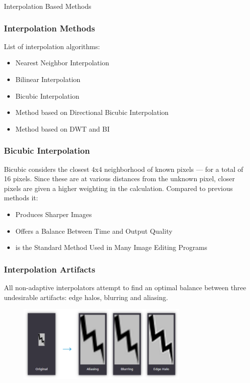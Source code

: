 \documentclass[11pt, presentation]{beamer}
\begin{document}
\begin{section}{Interpolation Based Methods}
\begin{frame}
\begin{figure}
                \label{fig:img-interpolation}
            \end{figure}
        \end{frame}
        \begin{frame}[label=interpolation]
            \frametitle{Interpolation Methods}
            List of interpolation algorithms:
            \begin{itemize}
                \item Nearest Neighbor Interpolation
                \item Bilinear Interpolation
                \item Bicubic Interpolation
                \item Method based on Directional Bicubic Interpolation
                \item Method based on DWT and BI
            \end{itemize}
        \end{frame}
        \begin{frame}
            \frametitle{Bicubic Interpolation}
            Bicubic considers the closest 4x4 neighborhood of known pixels — for a total of 16 pixels.
            Since these are at various distances from the unknown pixel, closer pixels are given a higher weighting in the calculation.
            Compared to previous methods it:
            \begin{itemize}
                \item Produces Sharper Images
                \item Offers a Balance Between Time and Output Quality
                \item is the Standard Method Used in Many Image Editing Programs
            \end{itemize}
        \end{frame}
        \begin{frame}
            \frametitle{Interpolation Artifacts}
            All non-adaptive interpolators attempt to find an optimal balance between three undesirable artifacts: edge halos, blurring and aliasing.
            \begin{figure}
                \includegraphics[width=0.75\textwidth]{images/interpolation-artifacts}

\end{figure}
\end{frame}
\end{section}
\end{document}
